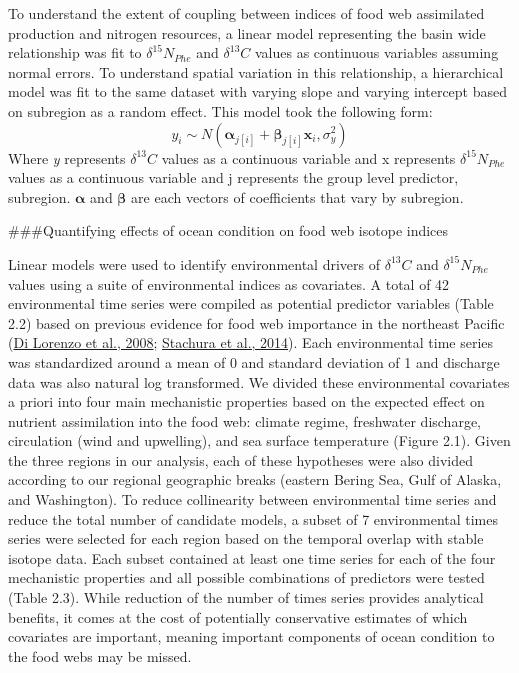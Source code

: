\documentclass [11pt, proquest] {uwthesis}[2015/03/03]
\begin{document}
To understand the extent of coupling between indices of food web assimilated production and nitrogen resources, a linear model representing the basin wide relationship was fit to \(\delta^{15}N_{Phe}\) and \(\delta^{13}C\) values as continuous variables assuming normal errors. To understand spatial variation in this relationship, a hierarchical model was fit to the same dataset with varying slope and varying intercept based on subregion as a random effect. This model took the following form:
\begin{equation} 
 y_i \sim N(\boldsymbol{\alpha}_{j[i]} + \boldsymbol{\beta}_{j[i]}\boldsymbol{x}_i, \sigma^2_y)
  \label{eq:hiermods}
\end{equation}
Where \emph{y} represents \(\delta^{13}C\) values as a continuous variable and x represents \(\delta^{15}N_{Phe}\) values as a continuous variable and j represents the group level predictor, subregion. \(\boldsymbol{\alpha}\) and \(\boldsymbol{\beta}\) are each vectors of coefficients that vary by subregion.

\#\#\#Quantifying effects of ocean condition on food web isotope indices

Linear models were used to identify environmental drivers of \(\delta^{13}C\) and \(\delta^{15}N_{Phe}\) values using a suite of environmental indices as covariates. A total of 42 environmental time series were compiled as potential predictor variables (Table 2.2) based on previous evidence for food web importance in the northeast Pacific (\protect\hyperlink{ref-DiLorenzo2008}{Di Lorenzo et al., 2008}; \protect\hyperlink{ref-Stachura2014}{Stachura et al., 2014}). Each environmental time series was standardized around a mean of 0 and standard deviation of 1 and discharge data was also natural log transformed. We divided these environmental covariates a priori into four main mechanistic properties based on the expected effect on nutrient assimilation into the food web: climate regime, freshwater discharge, circulation (wind and upwelling), and sea surface temperature (Figure 2.1). Given the three regions in our analysis, each of these hypotheses were also divided according to our regional geographic breaks (eastern Bering Sea, Gulf of Alaska, and Washington). To reduce collinearity between environmental time series and reduce the total number of candidate models, a subset of 7 environmental times series were selected for each region based on the temporal overlap with stable isotope data. Each subset contained at least one time series for each of the four mechanistic properties and all possible combinations of predictors were tested (Table 2.3). While reduction of the number of times series provides analytical benefits, it comes at the cost of potentially conservative estimates of which covariates are important, meaning important components of ocean condition to the food webs may be missed.
\end{document}
